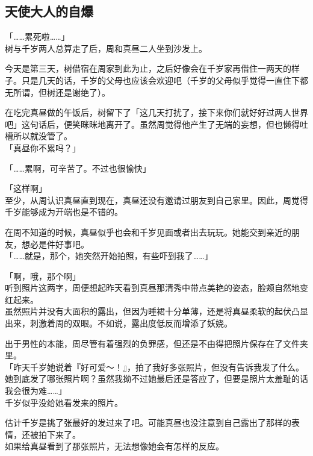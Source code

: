 \subsection{天使大人的自爆}

「……累死啦……」\\

树与千岁两人总算走了后，周和真昼二人坐到沙发上。

今天是第三天，树借宿在周家到此为止，之后好像会在千岁家再借住一两天的样子。只是几天的话，千岁的父母也应该会欢迎吧（千岁的父母似乎觉得一直住下都无所谓，但树还是谢绝了）。

在吃完真昼做的午饭后，树留下了「这几天打扰了，接下来你们就好好过两人世界吧」这句话后，便笑眯眯地离开了。虽然周觉得他产生了无端的妄想，但也懒得吐槽所以就没管了。\\

「真昼你不累吗？」

「……累啊，可辛苦了。不过也很愉快」

「这样啊」\\

至少，从周认识真昼直到现在，真昼还没有邀请过朋友到自己家里。因此，周觉得千岁能够成为开端也是不错的。

在周不知道的时候，真昼似乎也会和千岁见面或者出去玩玩。她能交到亲近的朋友，想必是件好事吧。\\

「……就是，那个，她突然开始拍照，有些吓到我了……」

「啊，哦，那个啊」\\

听到照片这两字，周便想起昨天看到真昼那清秀中带点美艳的姿态，脸颊自然地变红起来。\\

虽然照片并没有大面积的露出，但因为睡裙十分单薄，还是将真昼柔软的起伏凸显出来，刺激着周的双眼。不如说，露出度低反而增添了妖娆。

出于男性的本能，周尽管有着强烈的负罪感，但还是不由得把照片保存在了文件夹里。\\

「昨天千岁她说着『好可爱～！』，拍了我好多张照片，但没有告诉我发了什么。她到底发了哪张照片啊？虽然我拗不过她最后还是答应了，但要是照片太羞耻的话我会很为难……」\\

千岁似乎没给她看发来的照片。

估计千岁是挑了张最好的发过来了吧。可能真昼也没注意到自己露出了那样的表情，还被拍下来了。\\

如果给真昼看到了那张照片，无法想像她会有怎样的反应。

